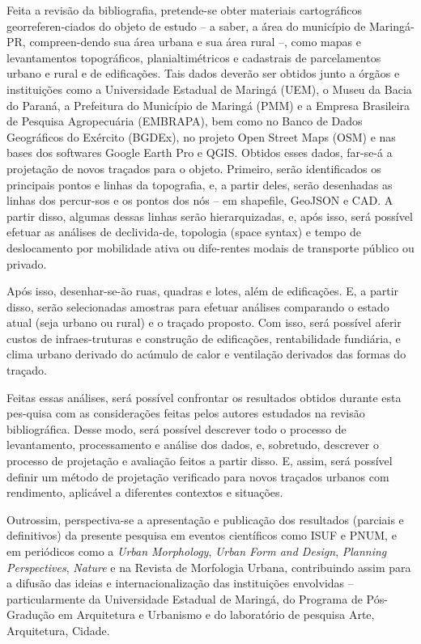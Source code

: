 \documentclass[twoside, 12pt]{book}
\begin{document}
\begin{enumerate}[label=\alph*)]
        Feita a revisão da bibliografia, pretende-se obter materiais cartográficos georreferen-ciados do objeto de estudo – a saber, a área do município de Maringá-PR, compreen-dendo sua área urbana e sua área rural –, como mapas e levantamentos topográficos, planialtimétricos e cadastrais de parcelamentos urbano e rural e de edificações. Tais dados deverão ser obtidos junto a órgãos e instituições como a Universidade Estadual de Maringá (UEM), o Museu da Bacia do Paraná, a Prefeitura do Município de Maringá (PMM) e a Empresa Brasileira de Pesquisa Agropecuária (EMBRAPA), bem como no Banco de Dados Geográficos do Exército (BGDEx), no projeto Open Street Maps (OSM) e nas bases dos softwares Google Earth Pro e QGIS. Obtidos esses dados, far-se-á a projetação de novos traçados para o objeto. Primeiro, serão identificados os principais pontos e linhas da topografia, e, a partir deles, serão desenhadas as linhas dos percur-sos e os pontos dos nós – em shapefile, GeoJSON e CAD. A partir disso, algumas dessas linhas serão hierarquizadas, e, após isso, será possível efetuar as análises de declivida-de, topologia (space syntax) e tempo de deslocamento por mobilidade ativa ou dife-rentes modais de transporte público ou privado. 

        Após isso, desenhar-se-ão ruas, quadras e lotes, além de edificações. E, a partir disso, serão selecionadas amostras para efetuar análises comparando o estado atual (seja urbano ou rural) e o traçado proposto. Com isso, será possível aferir custos de infraes-truturas e construção de edificações, rentabilidade fundiária, e clima urbano derivado do acúmulo de calor e ventilação derivados das formas do traçado.

        Feitas essas análises, será possível confrontar os resultados obtidos durante esta pes-quisa com as considerações feitas pelos autores estudados na revisão bibliográfica. Desse modo, será possível descrever todo o processo de levantamento, processamento e análise dos dados, e, sobretudo, descrever o processo de projetação e avaliação feitos a partir disso. E, assim, será possível definir um método de projetação verificado para novos traçados urbanos com rendimento, aplicável a diferentes contextos e situações.

        Outrossim, perspectiva-se a apresentação e publicação dos resultados (parciais e definitivos) da presente pesquisa em eventos científicos como ISUF e PNUM,  e em periódicos como a \textit{Urban Morphology}, \textit{Urban Form and Design}, \textit{Planning Perspectives}, \textit{Nature} e na Revista de Morfologia Urbana, contribuindo assim para a difusão das ideias e internacionalização das instituições envolvidas – particularmente da Universidade Estadual de Maringá, do Programa de Pós-Gradução em Arquitetura e Urbanismo e do laboratório de pesquisa Arte, Arquitetura, Cidade.


\end{enumerate}
\end{document}
